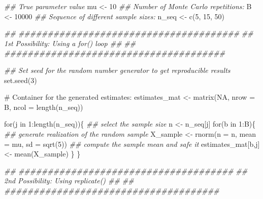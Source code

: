 \documentclass[
  letterpaper,
  DIV=11,
  numbers=noendperiod]{scrreprt}
\newenvironment{Shaded}{\begin{snugshade}}{\end{snugshade}}
\newcommand{\AttributeTok}[1]{\textcolor[rgb]{0.40,0.45,0.13}{#1}}
\newcommand{\CommentTok}[1]{\textcolor[rgb]{0.37,0.37,0.37}{#1}}
\newcommand{\ConstantTok}[1]{\textcolor[rgb]{0.56,0.35,0.01}{#1}}
\newcommand{\ControlFlowTok}[1]{\textcolor[rgb]{0.00,0.23,0.31}{#1}}
\newcommand{\DecValTok}[1]{\textcolor[rgb]{0.68,0.00,0.00}{#1}}
\newcommand{\DocumentationTok}[1]{\textcolor[rgb]{0.37,0.37,0.37}{\textit{#1}}}
\newcommand{\FunctionTok}[1]{\textcolor[rgb]{0.28,0.35,0.67}{#1}}
\newcommand{\NormalTok}[1]{\textcolor[rgb]{0.00,0.23,0.31}{#1}}
\newcommand{\OtherTok}[1]{\textcolor[rgb]{0.00,0.23,0.31}{#1}}
\newcommand{\SpecialCharTok}[1]{\textcolor[rgb]{0.37,0.37,0.37}{#1}}
\theoremstyle{definition}
\theoremstyle{plain}
\theoremstyle{plain}
\theoremstyle{remark}
\begin{document}
\begin{Shaded}
\begin{Highlighting}[]
\DocumentationTok{\#\# True parameter value }
\NormalTok{mu            }\OtherTok{\textless{}{-}} \DecValTok{10}
\DocumentationTok{\#\# Number of Monte Carlo repetitions:}
\NormalTok{B             }\OtherTok{\textless{}{-}} \DecValTok{10000}
\DocumentationTok{\#\# Sequence of different sample sizes:}
\NormalTok{n\_seq         }\OtherTok{\textless{}{-}} \FunctionTok{c}\NormalTok{(}\DecValTok{5}\NormalTok{, }\DecValTok{15}\NormalTok{, }\DecValTok{50}\NormalTok{)}


\DocumentationTok{\#\# \#\#\#\#\#\#\#\#\#\#\#\#\#\#\#\#\#\#\#\#\#\#\#\#\#\#\#\#\#\#\#\#\#\#\#\#\#\#}
\DocumentationTok{\#\# 1st Possibility: Using a for() loop \#\#}
\DocumentationTok{\#\# \#\#\#\#\#\#\#\#\#\#\#\#\#\#\#\#\#\#\#\#\#\#\#\#\#\#\#\#\#\#\#\#\#\#\#\#\#\#}

\DocumentationTok{\#\# Set seed for the random number generator to get reproducible results}
\FunctionTok{set.seed}\NormalTok{(}\DecValTok{3}\NormalTok{)}

\CommentTok{\# Container for the generated estimates:}
\NormalTok{estimates\_mat }\OtherTok{\textless{}{-}} \FunctionTok{matrix}\NormalTok{(}\ConstantTok{NA}\NormalTok{, }\AttributeTok{nrow =}\NormalTok{ B, }\AttributeTok{ncol =} \FunctionTok{length}\NormalTok{(n\_seq))}

\ControlFlowTok{for}\NormalTok{(j }\ControlFlowTok{in} \DecValTok{1}\SpecialCharTok{:}\FunctionTok{length}\NormalTok{(n\_seq))\{}
  \DocumentationTok{\#\# select the sample size}
\NormalTok{  n }\OtherTok{\textless{}{-}}\NormalTok{ n\_seq[j]}
  \ControlFlowTok{for}\NormalTok{(b }\ControlFlowTok{in} \DecValTok{1}\SpecialCharTok{:}\NormalTok{B)\{}
    \DocumentationTok{\#\# generate realization of the random sample }
\NormalTok{    X\_sample }\OtherTok{\textless{}{-}} \FunctionTok{rnorm}\NormalTok{(}\AttributeTok{n =}\NormalTok{ n, }\AttributeTok{mean =}\NormalTok{ mu, }\AttributeTok{sd =} \FunctionTok{sqrt}\NormalTok{(}\DecValTok{5}\NormalTok{))}
    \DocumentationTok{\#\# compute the sample mean and safe it}
\NormalTok{    estimates\_mat[b,j] }\OtherTok{\textless{}{-}} \FunctionTok{mean}\NormalTok{(X\_sample)}
\NormalTok{  \}}
\NormalTok{\}}

\DocumentationTok{\#\# \#\#\#\#\#\#\#\#\#\#\#\#\#\#\#\#\#\#\#\#\#\#\#\#\#\#\#\#\#\#\#\#\#\#\#\#\#}
\DocumentationTok{\#\# 2nd Possibility: Using replicate() \#\#}
\DocumentationTok{\#\# \#\#\#\#\#\#\#\#\#\#\#\#\#\#\#\#\#\#\#\#\#\#\#\#\#\#\#\#\#\#\#\#\#\#\#\#\#}


\end{Highlighting}
\end{Shaded}
\end{document}
